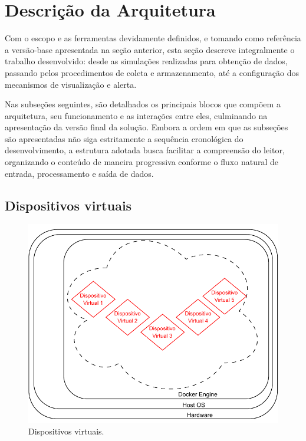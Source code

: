 \section{Descrição da Arquitetura}

Com o escopo e as ferramentas devidamente definidos, e tomando como referência a versão-base apresentada na seção anterior, esta seção descreve integralmente o trabalho desenvolvido: desde as simulações realizadas para obtenção de dados, passando pelos procedimentos de coleta e armazenamento, até a configuração dos mecanismos de visualização e alerta.

Nas subseções seguintes, são detalhados os principais blocos que compõem a arquitetura, seu funcionamento e as interações entre eles, culminando na apresentação da versão final da solução. Embora a ordem em que as subseções são apresentadas não siga estritamente a sequência cronológica do desenvolvimento, a estrutura adotada busca facilitar a compreensão do leitor, organizando o conteúdo de maneira progressiva conforme o fluxo natural de entrada, processamento e saída de dados.


\subsection{Dispositivos virtuais}
\label{subsection:DispositivosVirtuais}

\begin{figure}[H]
\centering
\includegraphics[scale=1]{Imagens/chap03/by-blocks/virtual_devices_diagram.pdf}
\caption{Dispositivos virtuais.}
\label{fig:DiagramaDispositivosVirtuais}
\end{figure}

